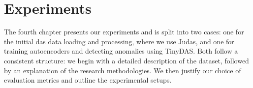 \chapter{Experiments}
\label{chap:exp}

The fourth chapter presents our experiments and is split into two cases: one for the initial \acrshort{das} data loading and processing, where we use Judas, and one for training autoencoders and detecting anomalies using TinyDAS. Both follow a consistent structure: we begin with a detailed description of the dataset, followed by an explanation of the research methodologies. We then justify our choice of evaluation metrics and outline the experimental setups.

\clearpage


